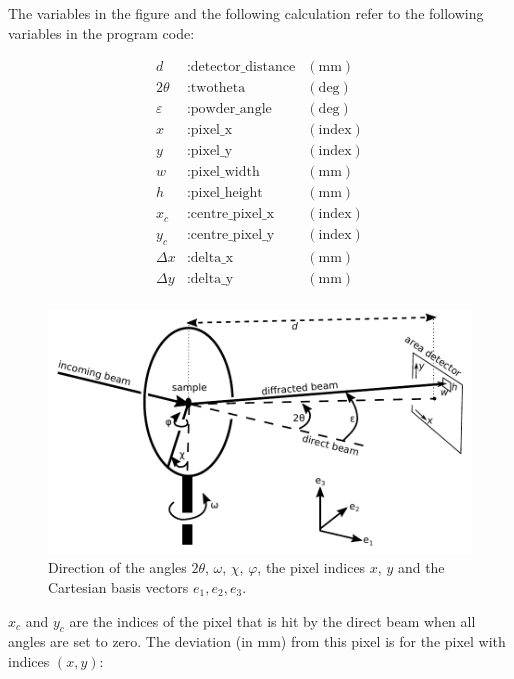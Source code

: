 \documentclass[a4paper, 12pt, twoside]{scrartcl}
\begin{document}
The variables in the figure and the following calculation refer to the following variables in the program code:

\begin{align*}
	d &: \text{detector\_distance} & (\mathrm{mm})\\
	2\theta &: \text{twotheta} & (\mathrm{deg})\\
	\varepsilon &: \text{powder\_angle} & (\mathrm{deg})\\
	x &: \text{pixel\_x} & (\mathrm{index})\\
	y &: \text{pixel\_y} & (\mathrm{index})\\
	w &: \text{pixel\_width} & (\mathrm{mm})\\
	h &: \text{pixel\_height} & (\mathrm{mm})\\
	x_c &: \text{centre\_pixel\_x} & (\mathrm{index})\\
	y_c &: \text{centre\_pixel\_y} & (\mathrm{index})\\
	\Delta x &: \text{delta\_x} & (\mathrm{mm})\\
	\Delta y &: \text{delta\_y} & (\mathrm{mm})\\
\end{align*}

\begin{figure}
\includegraphics{figs/goniometer.pdf}
\caption{\label{fig:goniometer}Direction of the angles $ 2\theta $, $ \omega $, $ \chi $, $ \varphi $, the pixel indices $ x $, $ y $ and the Cartesian basis vectors $ e_1, e_2, e_3 $.}
\end{figure}

$ x_c $ and $ y_c $ are the indices of the pixel that is hit by the direct beam when all angles are set to zero. The deviation (in mm) from this pixel is for the pixel with indices $ (x, y) $:
\end{document}
